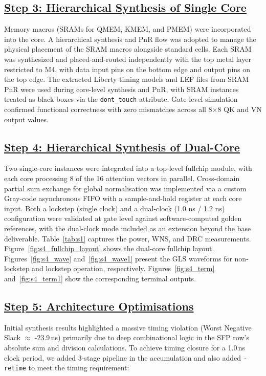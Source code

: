 \documentclass[journal]{IEEEtran}
\begin{document}
\subsection{\underline{\textnormal{Step 3: Hierarchical Synthesis of Single Core}}}
Memory macros (SRAMs for QMEM, KMEM, and PMEM) were incorporated into the core.
A hierarchical synthesis and PnR flow was adopted to manage the physical
placement of the SRAM macros alongside standard cells. Each SRAM was synthesized
and placed-and-routed independently with the top metal layer restricted to M4,
with data input pins on the bottom edge and output pins on the top edge. The
extracted Liberty timing models and LEF files from SRAM PnR were used during
core-level synthesis and PnR, with SRAM instances treated as black boxes via the
\texttt{dont\_touch} attribute. Gate-level simulation confirmed functional
correctness with zero mismatches across all 8$\times$8 QK and VN output values.



\subsection{\underline{\textnormal{Step 4: Hierarchical Synthesis of Dual-Core}}}
Two single-core instances were integrated into a top-level fullchip module, with each core processing 8 of the 16 attention vectors in parallel. Cross-domain partial sum exchange for global normalisation was implemented via a custom Gray-code asynchronous FIFO with a sample-and-hold register at each core input. Both a lockstep (single clock) and a dual-clock (1.0 ns / 1.2 ns) configuration were validated at gate level against software-computed golden references, with the dual-clock mode included as an extension beyond the base deliverable. Table~\ref{tab:s1} captures the power, WNS, and DRC measurements. Figure~\ref{fig:s4_fullchip_layout} shows the dual-core fullchip layout. Figures~\ref{fig:s4_wave} and~\ref{fig:s4_wave1} present the GLS waveforms for non-lockstep and lockstep operation, respectively. Figures~\ref{fig:s4_term} and~\ref{fig:s4_term1} show the corresponding terminal outputs.




\subsection{\underline{\textnormal{Step 5: Architecture Optimisations}}}
Initial synthesis results highlighted a massive timing violation (Worst Negative Slack $\approx$ -23.9\,ns) primarily due to deep combinational logic in the SFP row's absolute sum and division calculations. To achieve timing closure for a 1.0\,ns clock period, we added 3-stage pipeline in the accumulation and also added \texttt{-retime} to meet the timing requirement:
\end{document}
